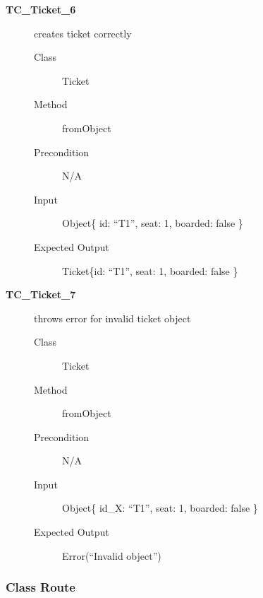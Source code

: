 \documentclass[11pt]{article}
\begin{document}
\begin{description}
\item[{\textbf{TC\_Ticket\_6}}] creates ticket correctly
\begin{description}
\item[{Class}] Ticket
\item[{Method}] fromObject
\item[{Precondition}] N/A
\item[{Input}] Object\{ id: “T1”, seat: 1, boarded: false \}
\item[{Expected Output}] Ticket\{id: “T1”, seat: 1, boarded: false \}
\end{description}

\item[{\textbf{TC\_Ticket\_7}}] throws error for invalid ticket object
\begin{description}
\item[{Class}] Ticket
\item[{Method}] fromObject
\item[{Precondition}] N/A
\item[{Input}] Object\{ id\_X: “T1”, seat: 1, boarded: false \}
\item[{Expected Output}] Error(“Invalid object”)
\end{description}
\end{description}

\subsubsection{Class Route}
\label{sec:org0d8758a}
\end{document}
